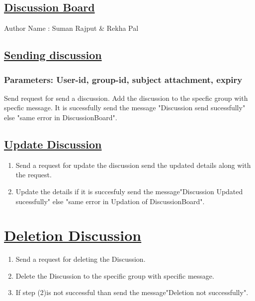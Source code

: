 \documentclass{article}
\begin{document}
 
\begin{center}
\section*{\underline{Discussion Board}}
                   Author Name : Suman Rajput \& Rekha Pal
\end{center}
\subsection*{\underline{Sending discussion}}
\subsubsection*{Parameters: User-id, group-id, subject attachment, expiry}
Send request for send a discussion.
Add the discussion to the specfic group with specfic message.
It is sucessfully send the message "Discussion send sucessfully" else "same error in DiscussionBoard".

\subsection*{\underline{Update Discussion}}
\begin{enumerate}
\item Send a request for update the discussion send the updated details along with the request.
\item Update the details if it is succesfuly send the message"Discussion Updated sucessfully" else "same error in Updation of DiscussionBoard".
\begin{center}

\label{figure:Updatedis.latex}
\end{center}
\end{enumerate}
\section*{\underline{Deletion Discussion}}
\begin{enumerate}
\item  Send a request for deleting the Discussion.
\item Delete the Discussion to the specific group with specific message.
\item If step (2)is not successful than send the message"Deletion not successfully".
\begin{center}

\label{figure:Deletiondis.latex}
\end{center}
\end{enumerate}
\end{document}
